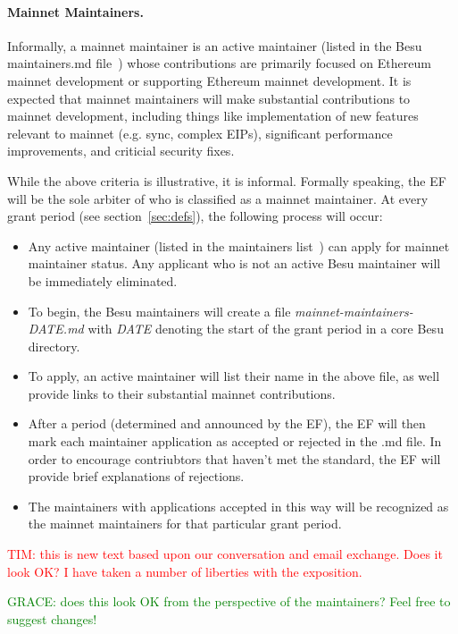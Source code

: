 \paragraph{Mainnet Maintainers.} Informally, a mainnet maintainer is an active maintainer (listed in the Besu maintainers.md file~\cite{BesuM}) whose contributions are primarily focused on Ethereum mainnet development or supporting Ethereum mainnet development.  It is expected that mainnet maintainers will make substantial contributions to mainnet development, including things like implementation of new features relevant to mainnet (e.g. sync, complex EIPs), significant performance improvements, and criticial security fixes.

While the above criteria is illustrative, it is informal.  Formally speaking, the EF will be the sole arbiter of who is classified as a mainnet maintainer.  At every grant period (see section~\ref{sec:defs}), the following process will occur:
\begin{itemize}
\item Any active maintainer (listed in the maintainers list~\cite{BesuM}) can apply for mainnet maintainer status.  Any applicant who is not an active Besu maintainer will be immediately eliminated.
\item To begin, the Besu maintainers will create a file \emph{mainnet-maintainers-DATE.md} with \emph{DATE} denoting the start of the grant period in a core Besu directory.
\item To apply, an active maintainer will list their name in the above file, as well provide links to their substantial mainnet contributions.
\item After a period (determined and announced by the EF), the EF will then mark each maintainer application as accepted or rejected in the .md file.  In order to encourage contriubtors that haven't met the standard, the EF will provide brief explanations of rejections.
\item The maintainers with applications accepted in this way will be recognized as the mainnet maintainers for that particular grant period.
\end{itemize}

\textcolor{red}{TIM:  this is new text based upon our conversation and email exchange.  Does it look OK?  I have taken a number of liberties with the exposition.}

\textcolor{green}{GRACE:  does this look OK from the perspective of the maintainers? Feel free to suggest changes!}

